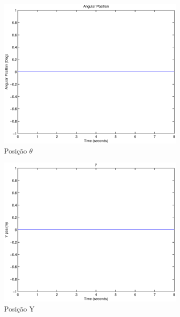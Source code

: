 \documentclass{article}
\begin{document}
\begin{figure}[H]
	\centering
	\begin{subfigure}{0.45\textwidth}
		\includegraphics[width=\linewidth]{matlab/theta8}
		\caption{Posição $\theta$}
	\end{subfigure}
	\begin{subfigure}{0.45\textwidth}
		\includegraphics[width=\linewidth]{matlab/y8}
		\caption{Posição Y}
	\end{subfigure}
	\begin{subfigure}{0.45\textwidth}

\end{subfigure}
\end{figure}
\end{document}
